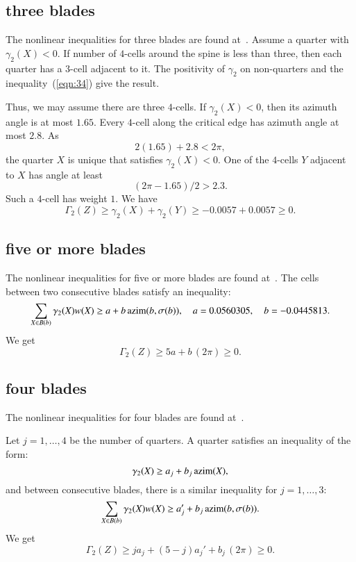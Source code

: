 \subsection{three blades}

The nonlinear inequalities for three blades are found at~\cite[cc:3bl:BIXPCGW]{hales:2009:nonlinear}.  Assume a quarter with $\gamma_2(X) <0$.  If number of $4$-cells around the spine is less than three, then each quarter has a $3$-cell adjacent to it.  The positivity of $\gamma_2$ on non-quarters and the inequality~(\ref{eqn:34}) give the result.  

Thus, we may assume there are three $4$-cells. If $\gamma_2(X)<0$, then its azimuth angle is at most $1.65$. Every $4$-cell along the critical edge has azimuth angle at most $2.8$.  As
$$
2 (1.65) + 2.8 < 2 \pi,
$$
the quarter $X$ is unique that satisfies $\gamma_2(X)<0$.  One of the $4$-cells $Y$ adjacent to $X$ has angle at least 
$$
(2\pi - 1.65)/2 > 2.3.
$$
Such a $4$-cell has weight $1$. We have
$$
\Gamma_2(Z)\ge \gamma_2(X) + \gamma_2(Y) \ge -0.0057 + 0.0057 \ge0.
$$



\subsection{five or more blades}

The nonlinear inequalities for five or more blades are found at~\cite[cc:5bl:ZTGIJCF]{hales:2009:nonlinear}.  The cells between two consecutive blades satisfy an inequality:
$$
\sum_{X\in B(b)} \gamma_2(X)w(X) \ge a + b\,{\operatorname{azim}}(b,\sigma(b)),
\quad a= 0.0560305, \quad b= -0.0445813.
$$
We get
$$
\Gamma_2(Z) \ge 5 a + b\, (2\pi) \ge 0.
$$

\subsection{four blades}

The nonlinear inequalities for four blades are found at~\cite[cc:4bl:QITNPEA]{hales:2009:nonlinear}.

Let $j=1,\ldots,4$ be the number of quarters.
A quarter satisfies an inequality of the form:
$$
\gamma_2(X) \ge a_j + b_j\, {\operatorname{azim}}(X),
$$
and between consecutive blades, there is a similar inequality for $j=1,\ldots,3$:
$$
\sum_{X\in B(b)} \gamma_2(X)w(X) \ge a_j' + b_j\,{\operatorname{azim}}(b,\sigma(b)).
$$
We get
\begin{equation}\label{eqn:4bl}
\Gamma_2(Z) \ge j a_j + (5-j) a_j' + b_j\, (2\pi) \ge 0.
\end{equation}

